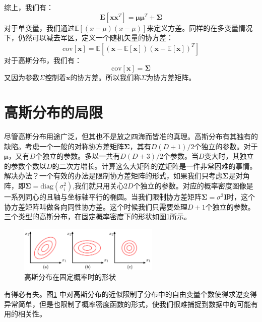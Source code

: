 \documentclass[10pt,a4paper,UTF8]{article}
\begin{document}
综上，我们有：
\begin{equation}
\label{eq:21}
\mathbf{E}[\mathbf{x}\mathbf{x}^{T}] = \mathbf{\mu}\mathbf{\mu}^{T} + \mathbf{\Sigma}
\end{equation}
对于单变量，我们通过\(\mathbb{E}[(x-\mu)(x-\mu)]\)来定义方差。同样的在多变量情况下，仍然可以减去军区，定义一个随机矢量的协方差：
\begin{equation}
\label{eq:22}
\mathrm{cov}[\mathbf{x}] = \mathbb{E}[ ( \mathbf{x} - \mathbb{E}[\mathbf{x}]  )( \mathbf{x} - \mathbb{E}[\mathbf{x}]  )^{T} ]
\end{equation}
对于高斯分布，我们有：
\begin{equation}
\label{eq:23}
\mathrm{cov}[\mathbf{x}] = \mathbf{\Sigma}
\end{equation}
又因为参数\(\mathbb{\Sigma}\)控制着\(\mathbf{x}\)的协方差。所以我们称\(\mathbb{\Sigma}\)为协方差矩阵。

\section{高斯分布的局限}
\label{sec:org5519203}


尽管高斯分布用途广泛，但其也不是放之四海而皆准的真理。高斯分布有其独有的缺陷。考虑一个一般的对称协方差矩阵\(\mathbf{\Sigma}\)，其有\(D(D+1)/2\)个独立的参数。对于\(\mathbf{\mu}\)，又有\(D\)个独立的参数。多以一共有\(D(D+3)/2\)个参数。当\(D\)变大时，其独立的参数个数以\(D\)的二次方增长。计算这么大矩阵的逆矩阵是一件非常困难的事情。解决办法？一个有效的办法是限制协方差矩阵的形式，如果我们只考虑\(\mathbf{\Sigma}\)是对角阵，即\(\mathbf{\Sigma} = \mathrm{diag}(\sigma_{i}^{2})\),我们就只用关心\(2D\)个独立的参数。对应的概率密度图像是一系列同心的且轴与坐标轴平行的椭圆。当我们限制协方差矩阵\(\mathbf{\Sigma} = \sigma^{2}\mathbf{I}\)时，这个协方差矩阵叫做各向同性协方差。这个时候我们只需要处理\(D+1\)个独立的参数。三个类型的高斯分布，在固定概率密度下的形状如图\ref{fig:org8b7ae47}所示。
\begin{figure}[htbp]
\centering
\includegraphics[width=0.6\textwidth]{../../img/computer_prml/20170615figure2dot8.png}
\caption{\label{fig:org8b7ae47}
高斯分布在固定概率时的形状}
\end{figure}

有得必有失。图\ref{fig:org8b7ae47} 中对高斯分布的近似限制了分布中的自由变量个数使得求逆变得异常简单，但是也限制了概率密度函数的形式，使我们很难捕捉到数据中的可能有用的相关性。
\end{document}

